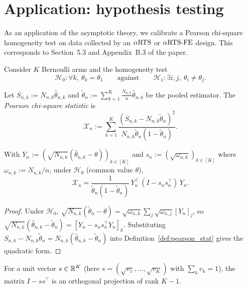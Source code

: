 \chapter{Application: hypothesis testing}
\label{chap:testing}

As an application of the asymptotic theory, we calibrate a Pearson chi-square
homogeneity test on data collected by an $\alpha\text{RTS}$ or $\alpha\text{RTS-FE}$ design. This
corresponds to Section~5.3 and Appendix~B.3 of the paper.

Consider $K$ Bernoulli arms and the homogeneity test
\[
  \mathcal{H}_0 : \forall k,\ \theta_k = \theta_1
  \qquad\text{against}\qquad
  \mathcal{H}_1 : \exists i,j,\ \theta_i \ne \theta_j.
\]

\begin{definition}\label{def:pearson_stat}
Let $S_{n,k} := N_{n,k}\hat{\theta}_{n,k}$ and
$\tilde{\theta}_n := \sum_{k=1}^K \frac{N_{n,k}}{n}\hat{\theta}_{n,k}$ be the
pooled estimator. The \emph{Pearson chi-square statistic} is
\[
  \mathcal{X}_n := \sum_{k=1}^K \frac{(S_{n,k} - N_{n,k}\tilde{\theta}_n)^2}
                                        {N_{n,k}\tilde{\theta}_n(1-\tilde{\theta}_n)}.
\]
\end{definition}

\begin{lemma}\label{lem:pearson_quadform}
With $Y_n := (\sqrt{N_{n,k}}(\hat{\theta}_{n,k}-\theta))_{k\in[K]}$ and
$s_n := (\sqrt{\omega_{n,k}})_{k\in[K]}$ where $\omega_{n,k}:=N_{n,k}/n$, under
$\mathcal{H}_0$ (common value $\theta$),
\[
  \mathcal{X}_n = \frac{1}{\tilde{\theta}_n(1-\tilde{\theta}_n)}\,
                  Y_n^\top\,(I - s_n s_n^\top)\,Y_n.
\]
\end{lemma}

\begin{proof}
Under $\mathcal{H}_0$, $\sqrt{N_{n,k}}(\tilde{\theta}_n-\theta)
 = \sqrt{\omega_{n,k}}\sum_j\sqrt{\omega_{n,j}}[Y_n]_j$, so
$\sqrt{N_{n,k}}(\hat{\theta}_{n,k}-\tilde{\theta}_n) = [Y_n - s_n s_n^\top Y_n]_k$.
Substituting $S_{n,k}-N_{n,k}\tilde{\theta}_n = N_{n,k}(\hat{\theta}_{n,k}-\tilde{\theta}_n)$
into Definition~\ref{def:pearson_stat} gives the quadratic form.
\end{proof}

\begin{lemma}\label{lem:projection}
\leanok
For a unit vector $s\in\mathbb{R}^K$ (here $s=(\sqrt{v_1},\dots,\sqrt{v_K})$ with
$\sum_k v_k=1$), the matrix $I - s s^\top$ is an orthogonal projection of rank
$K-1$.
\end{lemma}


